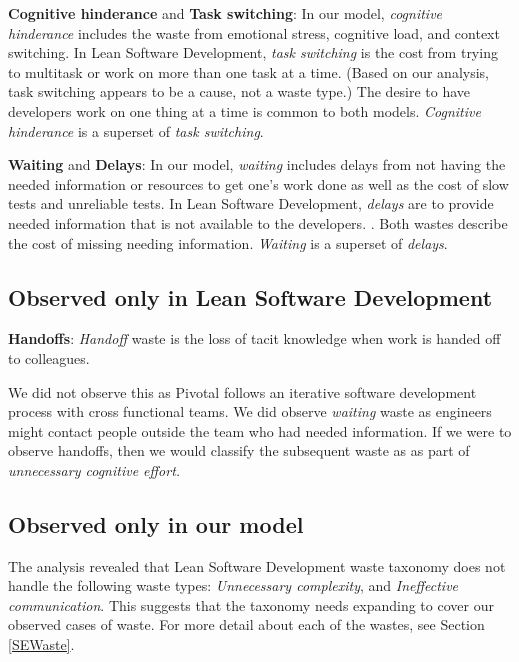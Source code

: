 \textbf{Cognitive hinderance} and \textbf{Task switching}: In our model, \textit{cognitive hinderance} includes the waste from emotional stress, cognitive load, and context switching. In Lean Software Development, \textit{task switching} is the cost from trying to multitask or work on more than one task at a time. (Based on our analysis, task switching appears to be a cause, not a waste type.) The desire to have developers work on one thing at a time is common to both models. \textit{Cognitive hinderance} is a superset of \textit{task switching}.  

\textbf{Waiting} and \textbf{Delays}: In our model, \textit{waiting} includes delays from not having the needed information or resources to get one's work done as well as the cost of slow tests and unreliable tests. In Lean Software Development, \textit{delays} are  to provide needed information that is not available to the developers. \cite{PoppendieckConceptToCash}. Both wastes describe the cost of missing needing information. \textit{Waiting} is a superset of \textit{delays}.
\subsection{Observed only in Lean Software Development}

\textbf{Handoffs}: \textit{Handoff} waste is the loss of tacit knowledge when work is handed off to colleagues.

We did not observe this as Pivotal follows an iterative software development process with cross functional teams. We did observe \textit{waiting} waste as engineers might contact people outside the team who had needed information. If we were to observe handoffs, then we would classify the subsequent waste as  as part of \textit{unnecessary cognitive effort.} 
\subsection{Observed only in our model}
The analysis revealed that Lean Software Development waste taxonomy does not handle the following waste types: \textit{Unnecessary complexity}, and \textit{Ineffective communication}. This suggests that the taxonomy needs expanding to cover our observed cases of waste. For more detail about each of the wastes, see Section \ref{SEWaste}.
